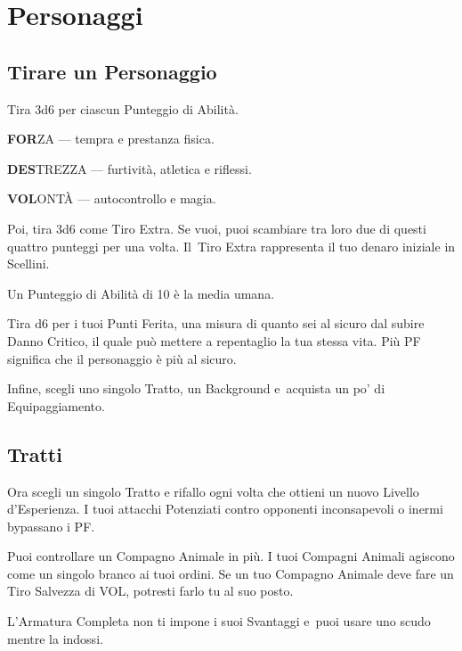 \documentclass[itdr]{subfiles}
\begin{document}
\chapter{Personaggi}
\label{ch:personaggi}

\section{Tirare un Personaggio}

Tira 3d6 per ciascun Punteggio di Abilità.

\textbf{FOR}ZA --- tempra e prestanza fisica.

\textbf{DES}TREZZA --- furtività, atletica e riflessi.

\textbf{VOL}ONTÀ --- autocontrollo e magia.

Poi, tira 3d6 come Tiro Extra. Se vuoi, puoi scambiare tra loro due di questi quattro punteggi per una volta. Il~Tiro Extra rappresenta il tuo denaro iniziale in Scellini.

Un Punteggio di Abilità di 10 è la media umana.

Tira d6 per i tuoi Punti Ferita, una misura di quanto sei al sicuro dal subire Danno Critico, il quale può mettere a repentaglio la tua stessa vita. Più PF significa che il personaggio è più al sicuro.

Infine, scegli uno singolo Tratto, un Background e~acquista un po’ di Equipaggiamento.

\vfill
\section{Tratti}

Ora scegli un singolo Tratto e rifallo ogni volta che ottieni un nuovo Livello d’Esperienza.
\vfill
{}
I tuoi attacchi Potenziati contro opponenti inconsapevoli o inermi bypassano i PF.

\vfill
{}\featmt
Puoi controllare un Compagno Animale in più. I tuoi Compagni Animali agiscono come un singolo branco ai tuoi ordini. Se un tuo Compagno Animale deve fare un Tiro Salvezza di VOL, potresti farlo tu al suo posto.

\vfill
{}
\feathp
L’Armatura Completa non ti impone i suoi Svantaggi e~puoi usare uno scudo mentre la indossi.
\end{document}
